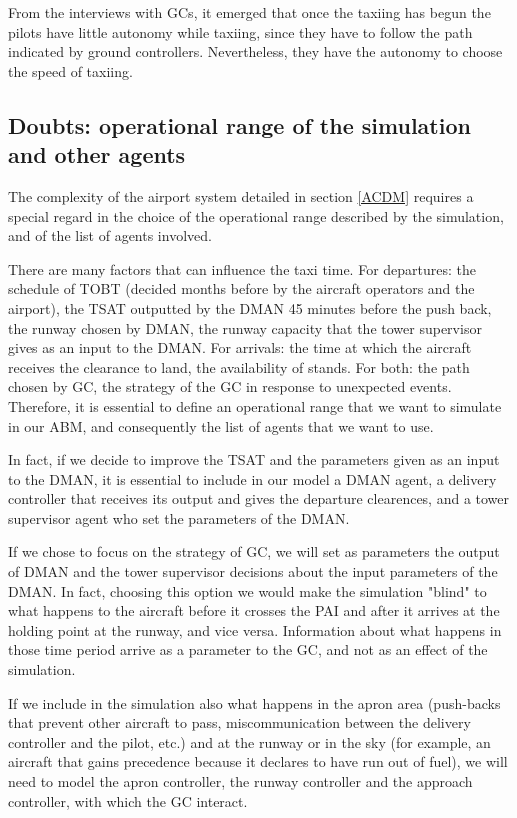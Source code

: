 \documentclass{article}
\begin{document}
From the interviews with GCs, it emerged that once the taxiing has begun the pilots have little autonomy while taxiing, since they have to follow the path indicated by ground controllers.
Nevertheless, they have the autonomy to choose the speed of taxiing.


\subsection{Doubts: operational range of the simulation and other agents}\label{other-agents}
The complexity of the airport system detailed in section \ref{ACDM} requires a special regard in the choice of the operational range described by the simulation, and of the list of agents involved.

There are many factors that can influence the taxi time. For departures: the schedule of TOBT (decided months before by the aircraft operators and the airport), the TSAT outputted by the DMAN 45 minutes before the push back, the runway chosen by DMAN, the runway capacity that the tower supervisor gives as an input to the DMAN. For arrivals: the time at which the aircraft receives the clearance to land, the availability of stands. For both: the path chosen by GC, the strategy of the GC in response to unexpected events.
Therefore, it is essential to define an operational range that we want to simulate in our ABM, and consequently the list of agents that we want to use. 

In fact, if we decide to improve the TSAT and the parameters given as an input to the DMAN, it is essential to include in our model a DMAN agent, a delivery controller that receives its output and gives the departure clearences, and a tower supervisor agent who set the parameters of the DMAN.

If we chose to focus on the strategy of GC, we will set as parameters the output of DMAN and the tower supervisor decisions about the input parameters of the DMAN. 
In fact, choosing this option we would make the simulation "blind" to what happens to the aircraft before it crosses the PAI and after it arrives at the holding point at the runway, and vice versa. Information about what happens in those time period arrive as a parameter to the GC, and not as an effect of the simulation. 

If we include in the simulation also what happens in the apron area (push-backs that prevent other aircraft to pass, miscommunication between the delivery controller and the pilot, etc.) and at the runway or in the sky (for example, an aircraft that gains precedence because it declares to have run out of fuel), we will need to model the apron controller, the runway controller and the approach controller, with which the GC interact. 
\end{document}
